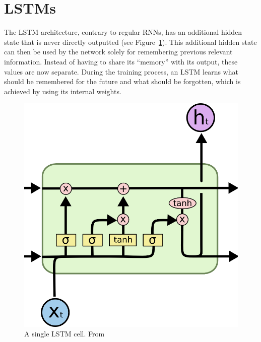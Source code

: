\section{LSTMs}

The LSTM architecture, contrary to regular RNNs, has an additional hidden state that is never directly outputted (see Figure~\ref{fig:lstm_cell}). This additional hidden state can then be used by the network solely for remembering previous relevant information. Instead of having to share its \enquote{memory} with its output, these values are now separate. During the training process, an LSTM learns what should be remembered for the future and what should be forgotten, which is achieved by using its internal weights.

\begin{figure}[H]
	\begin{center}
		\includegraphics[scale=0.5]{rnn/lstm_cell}
	\end{center}
	\caption{A single LSTM cell. From~\cite{olah2015understanding}\label{fig:lstm_cell}}
\end{figure}

